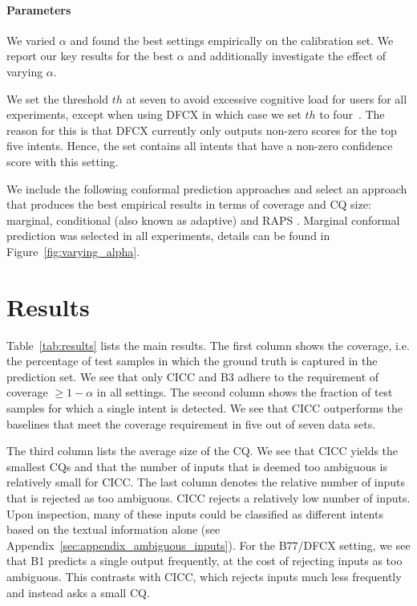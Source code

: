 \documentclass[11pt]{article}
\begin{document}
\paragraph{Parameters}
We varied $\alpha$ and found the best settings empirically on the calibration set. We report our key results for the best $\alpha$ and additionally investigate the effect of varying $\alpha$.

We set the threshold $th$ at seven to avoid excessive cognitive load for users for all experiments, except when using DFCX in which case we set $th$ to four~\cite{miller1956magical,plass2010cognitive}. The reason for this is that DFCX currently only outputs non-zero scores for the top five intents. Hence, the set contains all intents that have a non-zero confidence score with this setting.

We include the following conformal prediction approaches and select an approach that produces the best empirical results in terms of coverage and CQ size: marginal, conditional (also known as adaptive) \cite{romano2020classification} and RAPS \cite{angelopoulos2020uncertainty}. Marginal conformal prediction was selected in all experiments, details can be found in Figure~\ref{fig:varying_alpha}.

\section{Results}

Table~\ref{tab:results} lists the main results. The first column shows the coverage, i.e. the percentage of test samples in which the ground truth is captured in the prediction set. We see that only CICC and B3 adhere to the requirement of coverage $\geq 1-\alpha$ in all settings. The second column shows the fraction of test samples for which a single intent is detected. We see that CICC outperforms the baselines that meet the coverage requirement in five out of seven data sets.

The third column lists the average size of the CQ. We see that CICC yields the smallest CQs and that the number of inputs that is deemed too ambiguous is relatively small for CICC. The last column denotes the relative number of inputs that is rejected as too ambiguous. CICC rejects a relatively low number of inputs. Upon inspection, many of these inputs could be classified as different intents based on the textual information alone (see Appendix~\ref{sec:appendix_ambiguous_inputs}). For the B77/DFCX setting, we see that B1 predicts a single output frequently, at the cost of rejecting inputs as too ambiguous. This contrasts with CICC, which rejects inputs much less frequently and instead asks a small CQ.
\end{document}
